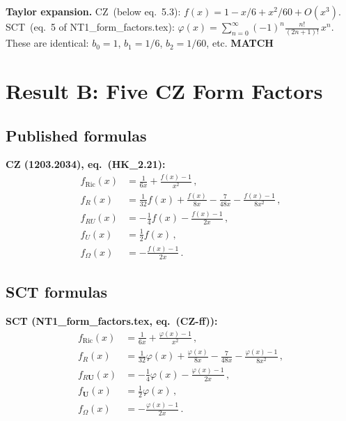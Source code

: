 \documentclass[12pt,a4paper]{article}
\theoremstyle{definition}
\theoremstyle{remark}
\newcommand{\match}{\textcolor{green!60!black}{\textbf{MATCH}}}
\begin{document}
\medskip\noindent
\textbf{Taylor expansion.}
CZ~(below eq.~5.3): $f(x) = 1 - x/6 + x^2/60 + O(x^3)$.\\
SCT~(eq.~5 of NT1\_form\_factors.tex):
$\varphi(x) = \sum_{n=0}^\infty (-1)^n \frac{n!}{(2n+1)!}\,x^n$.\\
These are identical: $b_0 = 1$, $b_1 = 1/6$, $b_2 = 1/60$, etc.
\match


\section{Result B: Five CZ Form Factors}
\label{sec:CZ-ff}

\subsection{Published formulas}

\noindent\textbf{CZ (1203.2034), eq.~(HK\_2.21):}
\begin{align}
  f_{\text{Ric}}(x) &= \frac{1}{6x} + \frac{f(x)-1}{x^2}\,,
  \label{eq:CZ-fRic}\\
  f_R(x) &= \frac{1}{32}f(x) + \frac{f(x)}{8x} - \frac{7}{48x}
             - \frac{f(x)-1}{8x^2}\,,\\
  f_{RU}(x) &= -\frac{1}{4}f(x) - \frac{f(x)-1}{2x}\,,\\
  f_U(x) &= \frac{1}{2}f(x)\,,\\
  f_\Omega(x) &= -\frac{f(x)-1}{2x}\,.
  \label{eq:CZ-fOmega}
\end{align}

\subsection{SCT formulas}

\noindent\textbf{SCT (NT1\_form\_factors.tex, eq.~(CZ-ff)):}
\begin{align}
  f_{\text{Ric}}(x) &= \frac{1}{6x} + \frac{\varphi(x)-1}{x^2}\,,\\
  f_R(x) &= \frac{1}{32}\varphi(x) + \frac{\varphi(x)}{8x} - \frac{7}{48x}
             - \frac{\varphi(x)-1}{8x^2}\,,\\
  f_{R\mathbf{U}}(x) &= -\frac{1}{4}\varphi(x) - \frac{\varphi(x)-1}{2x}\,,\\
  f_{\mathbf{U}}(x) &= \frac{1}{2}\varphi(x)\,,\\
  f_\Omega(x) &= -\frac{\varphi(x)-1}{2x}\,.
\end{align}
\end{document}
